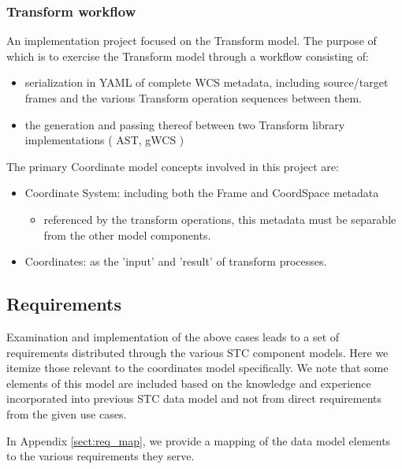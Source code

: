 \documentclass[11pt,a4paper]{ivoa}
\begin{document}
\subsubsection{Transform workflow}
\label{uc:Transform-workflow}
An implementation project focused on the Transform model. The purpose of which is to exercise the Transform model through a workflow consisting of:
  \begin{itemize}
    \item serialization in YAML of complete WCS metadata, including source/target frames and the various Transform operation sequences between them.
    \item the generation and passing thereof between two Transform library implementations ( AST, gWCS )
  \end{itemize}
  The primary Coordinate model concepts involved in this project are:
  \begin{itemize}
    \item Coordinate System: including both the Frame and CoordSpace metadata
    \begin{itemize}
       \item referenced by the transform operations, this metadata must be separable from the other model components.
    \end{itemize}
    \item Coordinates: as the 'input' and 'result' of transform processes.
  \end{itemize}
  
\subsection{Requirements}
\label{sect:reqs}

 Examination and implementation of the above cases leads to a set of requirements distributed through the various STC component models.  Here we 
itemize those relevant to the coordinates model specifically.  We note that some elements of this model are included based on the knowledge and 
experience incorporated into previous STC data model and not from direct requirements from the given use cases.  

In Appendix \ref{sect:req_map}, we provide a mapping of the data model elements to the various requirements they serve.
\end{document}
